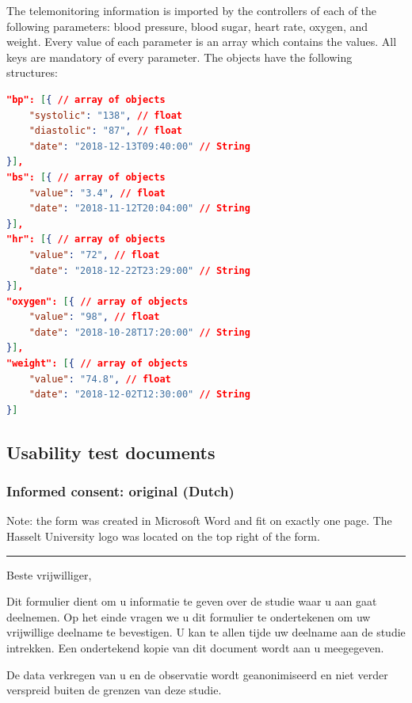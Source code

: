     The telemonitoring information is imported by the controllers of each of the following parameters: blood pressure, blood sugar, heart rate, oxygen, and weight. Every value of each parameter is an array which contains the values. All keys are mandatory of every parameter. The objects have the following structures:

\begin{lstlisting}[language=json,firstnumber=1]
"bp": [{ // array of objects
    "systolic": "138", // float
    "diastolic": "87", // float
    "date": "2018-12-13T09:40:00" // String
}],
"bs": [{ // array of objects
    "value": "3.4", // float
    "date": "2018-11-12T20:04:00" // String
}],
"hr": [{ // array of objects
    "value": "72", // float
    "date": "2018-12-22T23:29:00" // String
}],
"oxygen": [{ // array of objects
    "value": "98", // float
    "date": "2018-10-28T17:20:00" // String
}],
"weight": [{ // array of objects
    "value": "74.8", // float
    "date": "2018-12-02T12:30:00" // String
}]
\end{lstlisting}

\newpage
\subsection{Usability test documents}\label{appendix_test_docs}

    \subsubsection{Informed consent: original (Dutch)}\label{appendix_test_consent}

    Note: the form was created in Microsoft Word and fit on exactly one page. The Hasselt University logo was located on the top right of the form.
    
    \vspace{6pt}
    \hrule
    \vspace{6pt}
    \noindent Beste vrijwilliger,\bigskip
    
    \noindent Dit formulier dient om u informatie te geven over de studie waar u aan gaat deelnemen. Op het einde vragen we u dit formulier te ondertekenen om uw vrijwillige deelname te bevestigen. U kan te allen tijde uw deelname aan de studie intrekken. Een ondertekend kopie van dit document wordt aan u meegegeven.\bigskip
    
    \noindent De data verkregen van u en de observatie wordt geanonimiseerd en niet verder verspreid buiten de grenzen van deze studie.\bigskip

